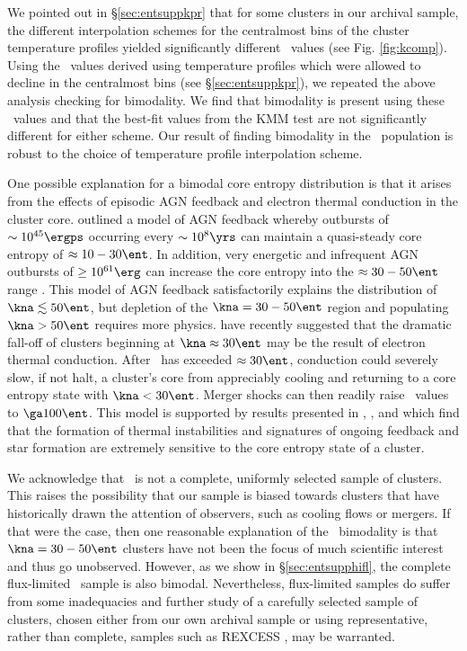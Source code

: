 We pointed out in \S\ref{sec:entsuppkpr} that for some clusters in our
archival sample, the different interpolation schemes for the
centralmost bins of the cluster temperature profiles yielded
significantly different \kna\ values (see Fig. \ref{fig:kcomp}). Using
the \kna\ values derived using temperature profiles which were allowed
to decline in the centralmost bins (see \S\ref{sec:entsuppkpr}), we repeated
the above analysis checking for bimodality. We find that bimodality is
present using these \kna\ values and that the best-fit values from the
KMM test are not significantly different for either scheme. Our result
of finding bimodality in the \kna\ population is robust to the choice
of temperature profile interpolation scheme.

One possible explanation for a bimodal core entropy distribution is
that it arises from the effects of episodic AGN feedback and electron
thermal conduction in the cluster core. \citet{agnframework} outlined
a model of AGN feedback whereby outbursts of $\sim 10^{45} \ergps$
occurring every $\sim 10^8 \yrs$ can maintain a quasi-steady core
entropy of $\approx 10-30 \ent$. In addition, very energetic and
infrequent AGN outbursts of $\geq 10^{61} \erg$ can increase the core
entropy into the $\approx 30-50 \ent$ range \citep{agnframework}. This
model of AGN feedback satisfactorily explains the distribution of
$\kna \lesssim 50 \ent$, but depletion of the $\kna = 30-50 \ent$
region and populating $\kna > 50 \ent$ requires more
physics. \citet{conduction} have recently suggested that the dramatic
fall-off of clusters beginning at $\kna \approx 30 \ent$ may be the
result of electron thermal conduction. After \kna\ has exceeded
$\approx 30 \ent$, conduction could severely slow, if not halt, a
cluster's core from appreciably cooling and returning to a core
entropy state with $\kna < 30 \ent$. Merger shocks can then readily
raise \kna\ values to $\ga 100 \ent$. This model is supported by
results presented in \citet{haradent}, \citet{2008ApJ...688..859G},
and \citet{2008ApJ...687..899R} which find that the formation of
thermal instabilities and signatures of ongoing feedback and star
formation are extremely sensitive to the core entropy state of a
cluster.

We acknowledge that \accept\ is not a complete, uniformly selected
sample of clusters. This raises the possibility that our sample is
biased towards clusters that have historically drawn the attention of
observers, such as cooling flows or mergers. If that were the case,
then one reasonable explanation of the \kna\ bimodality is that $\kna
= 30-50 \ent$ clusters have not been the focus of much scientific
interest and thus go unobserved. However, as we show in
\S\ref{sec:entsupphifl}, the complete flux-limited \hifl\ sample is also
bimodal. Nevertheless, flux-limited samples do suffer from some
inadequacies and further study of a carefully selected sample of
clusters, chosen either from our own archival sample or using
representative, rather than complete, samples such as REXCESS
\citep{rexcess}, may be warranted.

